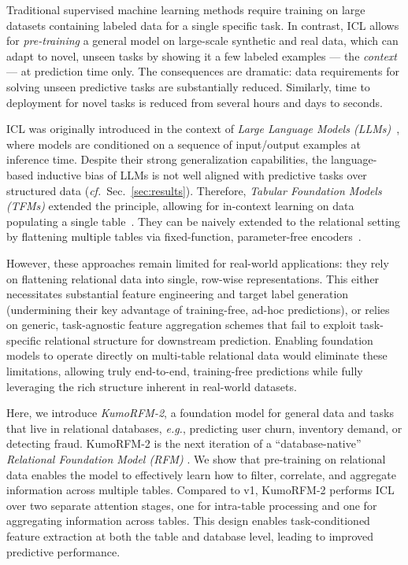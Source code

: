 \documentclass{article}
\newcommand{\onezero}{1\xspace}
\newcommand{\twozero}{2\xspace}
\newcommand{\name}{KumoRFM\xspace}
\newcommand{\nametwo}{\name-\twozero}
\begin{document}
Traditional supervised machine learning methods require training on large datasets containing labeled data for a single specific task. In contrast, ICL allows for \emph{pre-training} a general model on large-scale synthetic and real data, which can adapt to novel, unseen tasks by showing it a few labeled examples — the \emph{context} — at prediction time only.
The consequences are dramatic: data requirements for solving unseen predictive tasks are substantially reduced.
Similarly, time to deployment for novel tasks is reduced from several hours and days to seconds.

ICL was originally introduced in the context of \emph{Large Language Models (LLMs)}~\cite{transformer, gpt2, gpt3}, where models are conditioned on a sequence of input/output examples at inference time.
Despite their strong generalization capabilities, the language-based inductive bias of LLMs is not well aligned with predictive tasks over structured data (\emph{cf.}~Sec.~\ref{sec:results}).
Therefore, \emph{Tabular Foundation Models (TFMs)} extended the principle, allowing for in-context learning on data populating a single table~\citep{tabpfn}.
They can be naively extended to the relational setting by flattening multiple tables via fixed-function, parameter-free encoders~\citep{hayler2025bringing,eremeev2025turning,
xu2026rdblearn, wang2026reliclsynthetic}.

However, these approaches remain limited for real-world applications: they rely on flattening relational data into single, row-wise representations.
This either necessitates substantial feature engineering and target label generation (undermining their key advantage of training-free, ad-hoc predictions), or relies on generic, task-agnostic feature aggregation schemes that fail to exploit task-specific relational structure for downstream prediction. Enabling foundation models to operate directly on multi-table relational data would eliminate these limitations, allowing truly end-to-end, training-free predictions while fully leveraging the rich structure inherent in real-world datasets.

Here, we introduce \emph{\nametwo}, a foundation model for general data and tasks that live in relational databases, \emph{e.g.}, predicting user churn, inventory demand, or detecting fraud.
\nametwo is the next iteration of a ``database-native'' \emph{Relational Foundation Model (RFM)} \citep{fey2025kumorfm}.
We show that pre-training on relational data enables the model to effectively learn how to filter, correlate, and aggregate information across multiple tables.
Compared to v\onezero, \nametwo performs ICL over two separate attention stages, one for intra-table processing and one for aggregating information across tables.
This design enables task-conditioned feature extraction at both the table and database level, leading to improved predictive performance.
\end{document}
